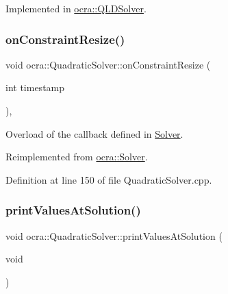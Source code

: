 Implemented in \hyperlink{classocra_1_1QLDSolver_a59bf1fba85f791bc1c30521373fcb999}{ocra\+::\+Q\+L\+D\+Solver}.

\hypertarget{classocra_1_1QuadraticSolver_aea64c3c099130835a5f42051921a0b6d}{}\label{classocra_1_1QuadraticSolver_aea64c3c099130835a5f42051921a0b6d} 
\subsubsection{\texorpdfstring{on\+Constraint\+Resize()}{onConstraintResize()}}
{\footnotesize\ttfamily void ocra\+::\+Quadratic\+Solver\+::on\+Constraint\+Resize (\begin{DoxyParamCaption}\item[{int}]{timestamp }\end{DoxyParamCaption})\hspace{0.3cm}{\ttfamily [protected]}, {\ttfamily [virtual]}}

Overload of the callback defined in \hyperlink{classocra_1_1Solver}{Solver}. 

Reimplemented from \hyperlink{classocra_1_1Solver_ad74c2f36dcee107636675bb6ff16e26a}{ocra\+::\+Solver}.



Definition at line 150 of file Quadratic\+Solver.\+cpp.

\hypertarget{classocra_1_1QuadraticSolver_a848c996e3a918c6cb0db3edf66c04cc1}{}\label{classocra_1_1QuadraticSolver_a848c996e3a918c6cb0db3edf66c04cc1} 
\subsubsection{\texorpdfstring{print\+Values\+At\+Solution()}{printValuesAtSolution()}}
{\footnotesize\ttfamily void ocra\+::\+Quadratic\+Solver\+::print\+Values\+At\+Solution (\begin{DoxyParamCaption}\item[{void}]{ }\end{DoxyParamCaption})\hspace{0.3cm}{\ttfamily [virtual]}}

